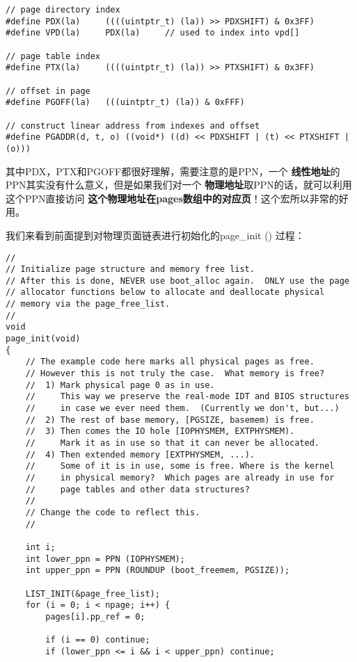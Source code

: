 \documentclass{article}
\newcommand{\highlight}[1]{{\bfseries \color{red}  #1}}
\newcommand{\funcname}[1]{{\ttfamily \small #1}}
\begin{document}
\begin{CJK*}{UTF8}{gkai}
\begin{lstlisting}[style=ccode, firstnumber=16, title={\scriptsize \ttfamily \bfseries inc/mmu.h}]
// page directory index
#define PDX(la)		((((uintptr_t) (la)) >> PDXSHIFT) & 0x3FF)
#define VPD(la)		PDX(la)		// used to index into vpd[]

// page table index
#define PTX(la)		((((uintptr_t) (la)) >> PTXSHIFT) & 0x3FF)

// offset in page
#define PGOFF(la)	(((uintptr_t) (la)) & 0xFFF)

// construct linear address from indexes and offset
#define PGADDR(d, t, o)	((void*) ((d) << PDXSHIFT | (t) << PTXSHIFT | (o)))
\end{lstlisting}


其中PDX，PTX和PGOFF都很好理解，需要注意的是PPN，一个\highlight{线性地址}的PPN其实没有什么意义，但是如果我们对一个\highlight{物理地址}取PPN的话，就可以利用这个PPN直接访问\highlight{这个物理地址在pages数组中的对应页}！这个宏所以非常的好用。

我们来看到前面提到对物理页面链表进行初始化的\funcname{page\_init ()} 过程：



\begin{lstlisting}[style=ccode, title={\scriptsize \ttfamily \bfseries kern/pmap.c: boot\_init ()}]
//
// Initialize page structure and memory free list.
// After this is done, NEVER use boot_alloc again.  ONLY use the page
// allocator functions below to allocate and deallocate physical
// memory via the page_free_list.
//
void
page_init(void)
{
    // The example code here marks all physical pages as free.
    // However this is not truly the case.  What memory is free?
    //  1) Mark physical page 0 as in use.
    //     This way we preserve the real-mode IDT and BIOS structures
    //     in case we ever need them.  (Currently we don't, but...)
    //  2) The rest of base memory, [PGSIZE, basemem) is free.
    //  3) Then comes the IO hole [IOPHYSMEM, EXTPHYSMEM).
    //     Mark it as in use so that it can never be allocated.
    //  4) Then extended memory [EXTPHYSMEM, ...).
    //     Some of it is in use, some is free. Where is the kernel
    //     in physical memory?  Which pages are already in use for
    //     page tables and other data structures?
    //
    // Change the code to reflect this.
    //

    int i;
    int lower_ppn = PPN (IOPHYSMEM);
    int upper_ppn = PPN (ROUNDUP (boot_freemem, PGSIZE));

    LIST_INIT(&page_free_list);
    for (i = 0; i < npage; i++) {
        pages[i].pp_ref = 0;

        if (i == 0) continue;
        if (lower_ppn <= i && i < upper_ppn) continue;
 

\end{lstlisting}
\end{CJK*}
\end{document}
